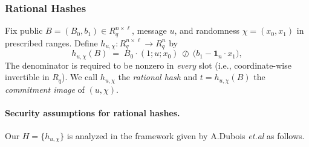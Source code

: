\subsubsection{Rational Hashes}

\begin{definition}\label{def:rational-hash}
Fix public $B=(B_0,b_1)\in R_q^{n\times \ell}$, message $u$, and randomness $\chi=(x_0,x_1)$ in prescribed ranges.
Define $h_{u,\chi}: R_q^{n\times \ell}\to R_q^n$ by
\[
  h_{u,\chi}(B)\;=\; B_0\cdot(1;u;x_0)\ \oslash\ \bigl(b_1-\mathbf{1}_n\cdot x_1\bigr),
\]
The denominator is required to
be nonzero in \emph{every} slot (i.e., coordinate-wise invertible in $R_q$). We call $h_{u,\chi}$ the \emph{rational hash}
and $t=h_{u,\chi}(B)$ the \emph{commitment image} of $(u,\chi)$.
\end{definition}



\paragraph{Security assumptions for rational hashes.}
Our $H=\{h_{u,\chi}\}$ is analyzed in the framework given by A.Dubois \emph{et.al} \cite{cryptoeprint:2025/356} as follows.

